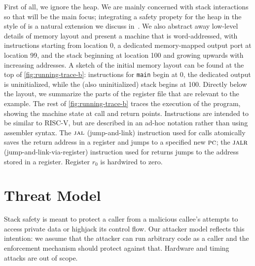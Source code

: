 \documentclass[acmsmall,review,anonymous]{acmart}\settopmatter{printfolios=true,printccs=false,printacmref=false}
\begin{document}
First of all, we ignore the heap. We are mainly concerned with stack
interactions so that will be the main focus; integrating a safety
propety for the heap in the
style of \citet{AzevedoDeAmorim17} is a natural extension we discuss
in~.
%
We also abstract away low-level details of memory layout and present a
machine that is word-addressed, with instructions starting from
location 0, a dedicated memory-mapped output port at location 99, and
the stack beginning at location 100 and growing upwards with increasing
addresses.  
%
A sketch of the initial memory layout can be found at the top of
\cref{fig:running-trace-b}: instructions for {\tt main} begin at 0,
the dedicated output is uninitialized, while the (also uninitialized)
stack begins at 100. Directly below the layout, we summarize the parts
of the register file that are relevant to the example.
%
The rest of \cref{fig:running-trace-b} traces the execution of the
program, showing the machine state at call and return points.
Instructions are intended to
be similar to RISC-V, but are described in an ad-hoc notation
rather than using assembler syntax. The $\textsc{jal}$ (jump-and-link)
instruction used for calls atomically saves the return address in a register
and jumps to a specified new $\textsc{pc}$; the $\textsc{jalr}$ (jump-and-link-via-register)
instruction used for returns jumps to the address stored in a register.
Register $r_0$ is hardwired to zero. 


\section{Threat Model}
\label{sec:threat}


Stack safety is meant to protect a caller from a malicious callee's
attempts to access private data or highjack its control flow. Our
attacker model reflects this intention: we assume that the attacker
can run arbitrary code as a caller and the enforcement mechanism
should protect against that. Hardware and timing attacks are out of
scope. 
\end{document}
